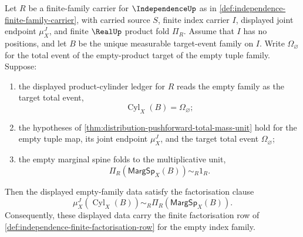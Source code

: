 \begin{closurestatus}{\IndependenceUp}
  \formalstatus{\axiomCleanV}
\end{closurestatus}

\begin{theorem}
\label{thm:independence-empty-index-factorization-row}
Let $R$ be a finite-family carrier for $\IndependenceUp$ as in \autoref{def:independence-finite-family-carrier}, with carried source $S$, finite index carrier $I$, displayed joint endpoint $\mu_X^J$, and finite $\RealUp$ product fold $\Pi_R$. Assume that $I$ has no positions, and let $B$ be the unique measurable target-event family on $I$. Write $\Omega_{\varnothing}$ for the total event of the empty-product target of the empty tuple family. Suppose:
\begin{enumerate}
\item the displayed product-cylinder ledger for $R$ reads the empty family as the target total event,
$$
\operatorname{Cyl}_X(B)=\Omega_{\varnothing};
$$
\item the hypotheses of \autoref{thm:distribution-pushforward-total-mass-unit} hold for the empty tuple map, its joint endpoint $\mu_X^J$, and the target total event $\Omega_{\varnothing}$;
\item the empty marginal spine folds to the multiplicative unit,
$$
\Pi_R(\mathsf{MargSp}_X(B))\sim_R1_R.
$$
\end{enumerate}
Then the displayed empty-family data satisfy the factorisation clause
$$
\mu_X^J(\operatorname{Cyl}_X(B))\sim_R\Pi_R(\mathsf{MargSp}_X(B)).
$$
Consequently, these displayed data carry the finite factorisation row of \autoref{def:independence-finite-factorisation-row} for the empty index family.
\end{theorem}
